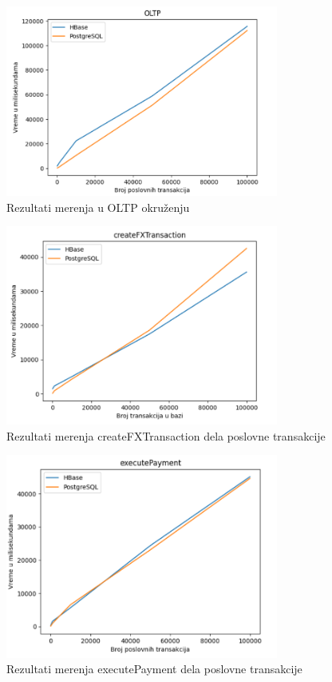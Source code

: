 \documentclass[12pt,oneside]{memoir}
\begin{document}
\begin{figure}[!ht]
  \centering
  \includegraphics[width=0.8\textwidth]{oltp-vizualization.png}
  \caption{Rezultati merenja u OLTP okruženju}
  \label{fig:grafikon}
\end{figure}

\begin{figure}[!ht]
  \centering
  \includegraphics[width=0.8\textwidth]{createFxTransaction-vizualization.png}
  \caption{Rezultati merenja createFXTransaction dela poslovne transakcije}
  \label{fig:grafikon}
\end{figure}

\pagebreak 
\begin{figure}[!ht]
  \centering
  \includegraphics[width=0.8\textwidth]{executePayment-vizualization.png}
  \caption{Rezultati merenja executePayment dela poslovne transakcije}
  \label{fig:grafikon}
\end{figure}
\end{document}
